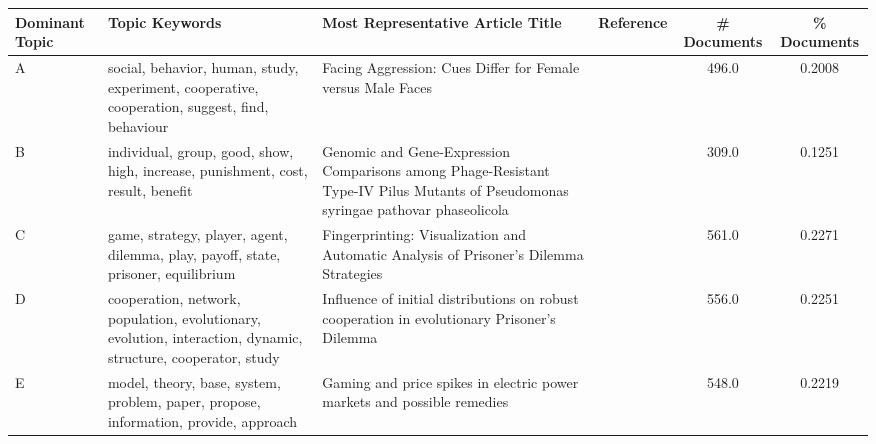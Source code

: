 \begin{tabularx}{1.5\textwidth}{lXXl|cc}
\toprule
Dominant Topic &                                                                                                 Topic Keywords &                                                                                                                                    Most Representative Article Title &        Reference &  \# Documents &  \% Documents \\
\midrule
A &                 social, behavior, human, study, experiment, cooperative, cooperation, suggest, find, behaviour &                                                                                      Facing Aggression: Cues Differ for Female versus Male Faces &  \cite{Geniole2012} &                496.0 &                   0.2008 \\
B &                               individual, group, good, show, high, increase, punishment, cost, result, benefit &  Genomic and Gene-Expression Comparisons among Phage-Resistant Type-IV Pilus Mutants of Pseudomonas syringae pathovar phaseolicola &  \cite{Sistrom2015} &                309.0 &                   0.1251 \\
C &                             game, strategy, player, agent, dilemma, play, payoff, state, prisoner, equilibrium &                                                            Fingerprinting: Visualization and Automatic Analysis of Prisoner's Dilemma Strategies &  \cite{Sistrom2015} &                561.0 &                   0.2271 \\
D &  cooperation, network, population, evolutionary, evolution, interaction, dynamic, structure, cooperator, study &                                                   Influence of initial distributions on robust cooperation in evolutionary  Prisoner's Dilemma &     \cite{Chen2007} &                556.0 &                   0.2251 \\
E &                           model, theory, base, system, problem, paper, propose, information, provide, approach &                                                                          Gaming and price spikes in electric power markets and possible remedies &     \cite{Guan2002} &                548.0 &                   0.2219 \\
\bottomrule
\end{tabularx}
